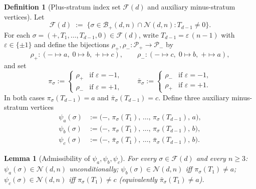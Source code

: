 \documentclass{amsart}
\newtheorem{lemma}[theorem]{Lemma}
\theoremstyle{definition}
\newtheorem{definition}[theorem]{Definition}
\theoremstyle{remark}
\begin{document}
\begin{definition}[Plus-stratum index set $\mathcal{F}(d)$ and
auxiliary minus-stratum vertices]
\label{def:F-and-psi}
Let
\[
  \mathcal{F}(d) \;:=\; \bigl\{\sigma \in
                    \mathcal{B}_+(d, n) \cap \mathcal{N}(d, n)
                    : T_{d-1} \neq 0\bigr\}.
\]
For each $\sigma = (+, T_1, \ldots, T_{d-1}, 0) \in
\mathcal{F}(d)$, write $T_{d-1} = \varepsilon\,(n-1)$ with
$\varepsilon \in \{\pm 1\}$ and define the bijections
$\rho_+, \rho_- : \mathcal{P}_+ \to \mathcal{P}_-$ by
\[
  \rho_+ : (- \mapsto a,\; 0 \mapsto b,\; + \mapsto c),
  \qquad
  \rho_- : (- \mapsto c,\; 0 \mapsto b,\; + \mapsto a),
\]
and set
\[
  \pi_\sigma := \begin{cases} \rho_+ & \text{if } \varepsilon = -1,\\
                              \rho_- & \text{if } \varepsilon = +1,\end{cases}
  \qquad
  \bar\pi_\sigma := \begin{cases} \rho_- & \text{if } \varepsilon = -1,\\
                                  \rho_+ & \text{if } \varepsilon = +1.\end{cases}
\]
In both cases $\pi_\sigma(T_{d-1}) = a$ and
$\bar\pi_\sigma(T_{d-1}) = c$.  Define three auxiliary
minus-stratum vertices
\begin{align*}
  \psi_a(\sigma) &:= \bigl(-,\, \pi_\sigma(T_1),\, \ldots,\, \pi_\sigma(T_{d-1}),\, a\bigr),\\
  \psi_b(\sigma) &:= \bigl(-,\, \pi_\sigma(T_1),\, \ldots,\, \pi_\sigma(T_{d-1}),\, b\bigr),\\
  \psi_c(\sigma) &:= \bigl(-,\, \bar\pi_\sigma(T_1),\, \ldots,\, \bar\pi_\sigma(T_{d-1}),\, b\bigr).
\end{align*}
\end{definition}

\begin{lemma}[Admissibility of $\psi_a, \psi_b, \psi_c$]
\label{lem:psi-admissibility}
For every $\sigma \in \mathcal{F}(d)$ and every $n \ge 3$:
$\psi_a(\sigma) \in \mathcal{N}(d, n)$ unconditionally;
$\psi_b(\sigma) \in \mathcal{N}(d, n)$ iff $\pi_\sigma(T_1) \neq a$;
$\psi_c(\sigma) \in \mathcal{N}(d, n)$ iff $\pi_\sigma(T_1) \neq c$
\textup{(}equivalently $\bar\pi_\sigma(T_1) \neq a$\textup{)}.
\end{lemma}
\end{document}
